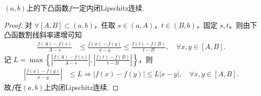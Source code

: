 \documentclass[../../main.tex]{subfiles}%
\begin{document}
\begin{theorem}[开区间上的下凸函数内闭Lipschitz连续]\label{theorem:开区间上的下凸函数一定内闭Lipschitz连续}
\((a,b)\)上的下凸函数\(f\)一定内闭Lipschitz连续.
\end{theorem}
\begin{proof}

对 $\forall [A,B] \subset (a,b)$，任取 $s\in (a,A)$，$t\in (B,b)$，固定 $s,t$。则由下凸函数割线斜率递增可知
\begin{align*}
\frac{f(A) - f(s)}{A - s} &\leqslant \frac{f(x) - f(y)}{x - y} \leqslant \frac{f(t) - f(B)}{t - B}, \quad \forall x,y\in [A,B].
\end{align*}
记 $L = \max\left\{\left|\frac{f(A) - f(s)}{A - s}\right|, \left|\frac{f(t) - f(B)}{t - B}\right|\right\}$，则
\begin{align*}
\left|\frac{f(x) - f(y)}{x - y}\right| &\leqslant L \Rightarrow \left|f(x) - f(y)\right| \leqslant L\left|x - y\right|, \quad \forall x,y\in [A,B].
\end{align*}
故\(f\)在$(a,b)$上内闭Lipschitz连续.

\end{proof}
\end{document}

